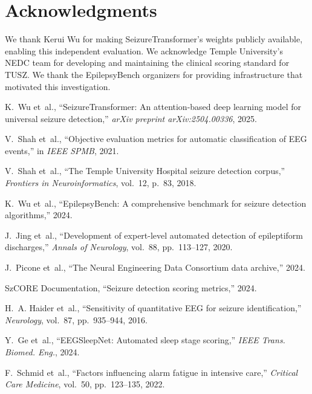 \documentclass[10pt,a4paper]{article}
\begin{document}
\section{Acknowledgments}

We thank Kerui Wu for making SeizureTransformer's weights publicly available, enabling this independent evaluation. We acknowledge Temple University's NEDC team for developing and maintaining the clinical scoring standard for TUSZ. We thank the EpilepsyBench organizers for providing infrastructure that motivated this investigation.


\begin{thebibliography}{10}

K.~Wu et~al., ``SeizureTransformer: An attention-based deep learning model for universal seizure detection,'' \textit{arXiv preprint arXiv:2504.00336}, 2025.

V.~Shah et~al., ``Objective evaluation metrics for automatic classification of EEG events,'' in \textit{IEEE SPMB}, 2021.

V.~Shah et~al., ``The Temple University Hospital seizure detection corpus,'' \textit{Frontiers in Neuroinformatics}, vol.~12, p.~83, 2018.

K.~Wu et~al., ``EpilepsyBench: A comprehensive benchmark for seizure detection algorithms,'' 2024.

J.~Jing et~al., ``Development of expert-level automated detection of epileptiform discharges,'' \textit{Annals of Neurology}, vol.~88, pp.~113--127, 2020.

J.~Picone et~al., ``The Neural Engineering Data Consortium data archive,'' 2024.

SzCORE Documentation, ``Seizure detection scoring metrics,'' 2024.

H.~A. Haider et~al., ``Sensitivity of quantitative EEG for seizure identification,'' \textit{Neurology}, vol.~87, pp.~935--944, 2016.

Y.~Ge et~al., ``EEGSleepNet: Automated sleep stage scoring,'' \textit{IEEE Trans. Biomed. Eng.}, 2024.

F.~Schmid et~al., ``Factors influencing alarm fatigue in intensive care,'' \textit{Critical Care Medicine}, vol.~50, pp.~123--135, 2022.

\end{thebibliography}
\end{document}
